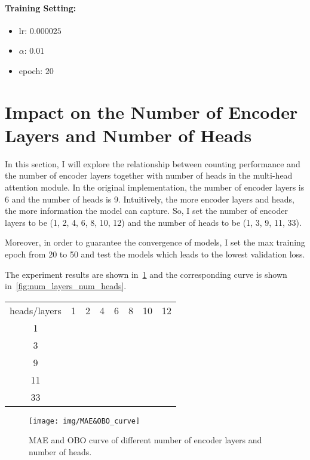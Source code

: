 \documentclass[10pt,twocolumn,letterpaper]{article}
\begin{document}
    \paragraph{Training Setting:}
    \begin{itemize}
        \item lr: $0.000025$
        \item $\alpha$: $0.01$
        \item epoch: $20$
    \end{itemize}



    \section{Impact on the Number of Encoder Layers and Number of Heads}
    \label{sec:num_layers_num_heads}
    In this section, I will explore the relationship between counting performance and the number of encoder layers
    together with number of heads in the multi-head attention module.
    In the original implementation, the number of encoder layers is 6 and the number of heads is 9.
    Intuitively, the more encoder layers and heads, the more information the model can capture.
    So, I set the number of encoder layers to be (1, 2, 4, 6, 8, 10, 12) and the number of heads to be (1, 3, 9, 11, 33).

    Moreover, in order to guarantee the convergence of models, I set the max training epoch from 20 to 50 and test the models
    which leads to the lowest validation loss.

    The experiment results are shown in~\ref{tab:num_layers_num_heads} and the corresponding curve is shown in~\ref{fig:num_layers_num_heads}.
    \begin{table}
        \centering
        \begin{tabular}[H]{c c c c c c c c}
            heads/layers & 1 & 2 & 4 & 6 & 8 & 10 & 12 \\
            1 & & & & & & &\\
            3 & & & & & & &\\
            9 & & & & & & &\\
            11 & & & & & & &\\
            33 & & & & & & &\\
        \end{tabular}
        \label{tab:num_layers_num_heads}
    \end{table}

    \begin{figure}
        \centering
        \texttt{[image: img/MAE\&OBO\_curve]}
        \caption{MAE and OBO curve of different number of encoder layers and number of heads.}
        \label{fig:}
    \end{figure}

    {\small
    
    
    }
\end{document}
